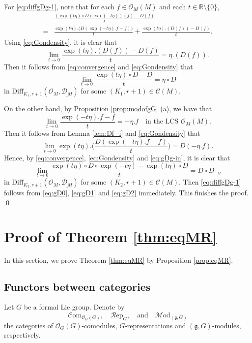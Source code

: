 \documentclass[12pt, a4paper]{amsart}
\newcommand{\BR}{{\mathbb {R}}}
\newcommand{\CO}{{\mathcal {O}}}
\newcommand{\g}{\mathfrak g}
\newcommand{\be}{\begin {equation}}
\newcommand{\ee}{\end {equation}}
\newcommand{\qaq}{\quad\textrm{and}\quad}
\theoremstyle{Theorem}
\theoremstyle{Theorem}
\theoremstyle{Theorem}
\theoremstyle{Theorem}
\theoremstyle{Plain}
\theoremstyle{remark}
\theoremstyle{remark}
\theoremstyle{Definition}
\numberwithin{equation}{section}
\begin{document}
For \eqref{eq:diffgDg-1}, note that for each $f\in \CO_M(M)$ and each $t\in\BR\setminus\{0\}$, 
\be\label{eq:gD0} \begin{aligned}
    &\frac{(\exp(t\eta)\circ D\circ\exp(-t\eta) )(f)-D(f)}{t}\\=&\frac{\exp(t\eta).\big(D(\exp(-t\eta).f-f)\big)}{t}+\frac{\exp(t\eta).(D(f))-D(f)}{t}.
\end{aligned}\ee 
Using \eqref{eq:Gondensity}, it is clear that \[\lim_{t\rightarrow 0} \frac{\exp(t\eta).(D(f))-D(f)}{t}=\eta.(D(f)).\]
Then it follows from  \eqref{eq:convergence} and \eqref{eq:Gondensity} that 
\be\label{eq:gD1} \lim_{t\rightarrow 0 }\frac{\exp(t\eta)\circ D-D}{t}=\eta\circ D\ee
in $\mathrm{Diff}_{K_1,r+1}(\CO_M,\underline{\mathcal{D}_M})$ for some $(K_1,r+1)\in \mathcal{C}(M)$. 

On the other hand, by Proposition \ref{prop:modofgG} (a), we have that  
\[\lim_{t\rightarrow 0} \frac{\exp(-t\eta).f-f}{t}=-\eta.f \quad \text{in the LCS $\CO_M(M)$}.\] Then it follows from Lemma \ref{lem:Df_i} and \eqref{eq:Gondensity} that 
\[\lim_{t\rightarrow 0}\exp(t\eta).\big(\frac{D(\exp(-t\eta).f-f)}{t}\big)=D(-\eta.f). \] Hence, by \eqref{eq:convergence}, \eqref{eq:Gondensity} and \eqref{eq:gDg-in}, it is clear that 
\be\label{eq:gD2} \lim_{t\rightarrow 0}\frac{\exp(t\eta)\circ D\circ \exp(-t\eta)-\exp(t\eta)\circ D}{t}=D\circ D_{-\eta}\ee in $\mathrm{Diff}_{K_2,r+1}(\CO_M,\underline{\mathcal{D}_M})$ for some $(K_2,r+1)\in \mathcal{C}(M)$. 
Then \eqref{eq:diffgDg-1} follows from \eqref{eq:gD0},  \eqref{eq:gD1} and \eqref{eq:gD2} immediately. This finishes the proof. \qed




\section{Proof of Theorem  \ref{thm:eqMR}} 
In this section, we prove Theorem \ref{thm:eqMR} by Proposition \ref{prop:eqMR}.
\subsection{Functors between categories} 
Let $G$ be a formal Lie group.
Denote by 
\[\mathcal{C}\mathrm{om}_{\CO_G(G)},\quad{\mathcal{R}}\mathrm{ep}_{G},\qaq \mathcal{M}\mathrm{od}_{(\g,\underline{G})}\]
the categories of  $\CO_G(G)$-comodules, $G$-representations  and $(\g,\underline G)$-modules, respectively. 
\end{document}
